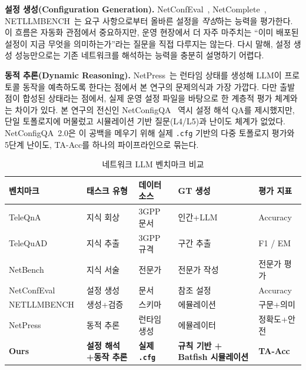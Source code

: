 \documentclass[journal]{IEEEtran}
\begin{document}
\textbf{설정 생성(Configuration Generation).} NetConfEval~\cite{ref5}, NetComplete~\cite{ref28}, NETLLM\allowbreak BENCH~\cite{ref12}는 요구 사항으로부터 올바른 설정을 \emph{작성}하는 능력을 평가한다. 이 흐름은 자동화 관점에서 중요하지만, 운영 현장에서 더 자주 마주치는 ``이미 배포된 설정이 지금 무엇을 의미하는가''라는 질문을 직접 다루지는 않는다. 다시 말해, 설정 생성 성능만으로는 기존 네트워크를 해석하는 능력을 충분히 설명하기 어렵다.

\textbf{동적 추론(Dynamic Reasoning).} NetPress~\cite{ref7}는 런타임 상태를 생성해 LLM이 프로토콜 동작을 예측하도록 한다는 점에서 본 연구의 문제의식과 가장 가깝다. 다만 출발점이 합성된 상태라는 점에서, 실제 운영 설정 파일을 바탕으로 한 계층적 평가 체계와는 차이가 있다. 본 연구의 전신인 NetConfigQA~\cite{ref26} 역시 설정 해석 QA를 제시했지만, 단일 토폴로지에 머물렀고 시뮬레이션 기반 질문(L4/L5)과 난이도 체계가 없었다. NetConfigQA~2.0은 이 공백을 메우기 위해 실제 \texttt{.cfg} 기반의 다중 토폴로지 평가와 5단계 난이도, TA-Acc를 하나의 파이프라인으로 묶는다.

\begin{table}[!t]
  \caption{네트워크 LLM 벤치마크 비교}
  \label{tab:benchmark-comparison}
  \centering
  \small
  \begin{tabular}{|L{3.0cm}|L{2.4cm}|L{2.2cm}|L{2.1cm}|L{2.1cm}|}
    \hline
    \textbf{벤치마크}                        & \textbf{태스크 유형}      & \textbf{데이터 소스}           & \textbf{GT 생성}                 & \textbf{평가 지표}  \\
    \hline
    TeleQnA~\cite{ref9}                  & 지식 회상                & 3GPP 문서                   & 인간+LLM                         & Accuracy        \\
    \hline
    TeleQuAD~\cite{ref10}                & 지식 추출                & 3GPP 규격                   & 구간 추출                          & F1 / EM         \\
    \hline
    NetBench~\cite{ref11}                & 지식 서술                & 전문가                       & 전문가 작성                         & 전문가 평가          \\
    \hline
    NetConfEval~\cite{ref5}              & 설정 생성                & 문서                        & 참조 설정                          & Accuracy        \\
    \hline
    NETLLM\allowbreak BENCH~\cite{ref12} & 생성+검증                & 스키마                       & 에뮬레이션                          & 구문+의미           \\
    \hline
    NetPress~\cite{ref7}                 & 동적 추론                & 런타임 생성                    & 에뮬레이터                          & 정확도+안전          \\
    \hline
    \textbf{Ours}                        & \textbf{설정 해석+동작 추론} & \textbf{실제 \texttt{.cfg}} & \textbf{규칙 기반 + Batfish 시뮬레이션} & \textbf{TA-Acc} \\
    \hline
  \end{tabular}
\end{table}
\end{document}
